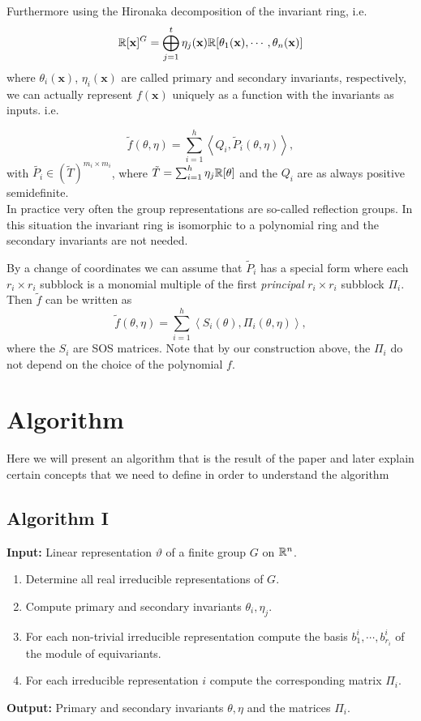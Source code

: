\documentclass[]{article}
\begin{document}
Furthermore using the Hironaka decomposition of the invariant ring, i.e.
\[\mathbb R[\mathbf{x}]^G = \bigoplus_{j=1}^{t}\eta_j(\textbf{x})\mathbb R[\theta_1(\textbf{x}), \cdots, \theta_n(\mathbf{x})]\] 
where $\theta_i(\mathbf{x})$, $\eta_i(\mathbf{x})$ are called primary and secondary invariants, respectively, 
we can actually represent $f(\mathbf{x})$ uniquely as a function with the invariants as inputs. i.e.

\[\tilde{f}(\theta,\eta) = \sum_{i=1}^{h}\left<Q_i,\tilde{P}_i(\theta,\eta)\right>,\] 
with $\tilde{P_i} \in (\tilde{T})^{m_i\times m_i}$, where $\tilde{T} = \sum_{i=1}^{h}\eta_j\mathbb R[\theta]$ and the $Q_i$ are as always positive semidefinite.\\
In practice very often the group representations are so-called reflection groups. In this situation the invariant ring is 
isomorphic to a polynomial ring and the secondary invariants are not needed. %

By a change of coordinates we can assume that $\tilde{P}_i$ has a special form where each $r_i\times r_i$ subblock is a monomial multiple of the first \textit{principal} $r_i\times r_i$ subblock $\Pi_i$. Then $\tilde{f}$ can be written as 
\[
    \tilde{f}(\theta, \eta)=\sum_{i=1}^h\left<S_i(\theta),\Pi_i(\theta,\eta)\right>,
\]
where the $S_i$ are SOS matrices. %
Note that by our construction above, the $\Pi_i$ do not depend on the choice of the polynomial $f$.



\section{Algorithm}
Here we will present an algorithm that is the result of the paper and later explain certain concepts that we need to define in order to understand the algorithm

\subsection*{Algorithm I}


\textbf{Input:} Linear representation $\vartheta$ of a finite group $G$ on $\mathbb R^n$.

\begin{enumerate}
    \item Determine all real irreducible representations of $G$.
    \item Compute primary and secondary invariants $\theta_i,\eta_j$. 
    \item For each non-trivial irreducible representation compute the basis $b_1^i,\cdots, b_{r_i}^i$ of the module of equivariants.
    \item For each irreducible representation $i$ compute the corresponding matrix $\Pi_i$.
\end{enumerate}
\noindent
\textbf{Output:} Primary and secondary invariants $\theta,\eta$ and the matrices $\Pi_i$.
\end{document}

